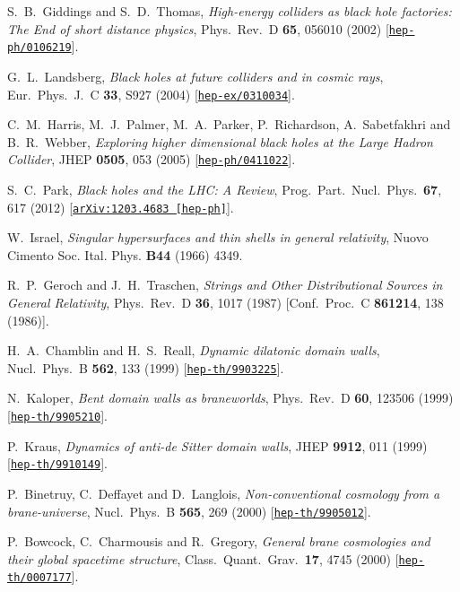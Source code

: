 \documentclass[aps,12pt,prd,superscriptaddress,preprintnumbers, 
	amssymb,
	amsmath,
	notitlepage,
	longbibliography,
	nofootinbib]{revtex4-1}
\begin{document}
\begin{thebibliography}{10}
S.~B.~Giddings and S.~D.~Thomas,
{\it High-energy colliders as black hole factories: The End of short distance physics},
Phys.\ Rev.\ D {\bf 65}, 056010 (2002)
[\href{http://xxx.lanl.gov/abs/hep-ph/0106219}{{\tt hep-ph/0106219}}].

G.~L.~Landsberg,
{\it Black holes at future colliders and in cosmic rays},
Eur.\ Phys.\ J.\ C {\bf 33}, S927 (2004)
[\href{http://xxx.lanl.gov/abs/hep-ex/0310034}{{\tt hep-ex/0310034}}].

C.~M.~Harris, M.~J.~Palmer, M.~A.~Parker, P.~Richardson, 
A.~Sabetfakhri and B.~R.~Webber,
{\it Exploring higher dimensional black holes at the Large Hadron Collider},
JHEP {\bf 0505}, 053 (2005)
[\href{http://xxx.lanl.gov/abs/hep-ph/0411022}{{\tt hep-ph/0411022}}].

S.~C.~Park,
{\it Black holes and the LHC: A Review},
Prog.\ Part.\ Nucl.\ Phys.\  {\bf 67}, 617 (2012)
[\href{http://xxx.lanl.gov/abs/1203.4683}{{\tt arXiv:1203.4683 [hep-ph]}}].

W.~Israel,
{\it {Singular hypersurfaces and thin shells in general relativity}},  
Nuovo Cimento Soc. Ital. Phys. {\bf B44} (1966) 4349.

R.~P.~Geroch and J.~H.~Traschen,
{\it Strings and Other Distributional Sources in General Relativity},
Phys.\ Rev.\ D {\bf 36}, 1017 (1987)
[Conf.\ Proc.\ C {\bf 861214}, 138 (1986)].

H.~A.~Chamblin and H.~S.~Reall,
{\it Dynamic dilatonic domain walls},
Nucl.\ Phys.\ B {\bf 562}, 133 (1999)
[\href{http://xxx.lanl.gov/abs/hep-th/9903225}{{\tt hep-th/9903225}}].

N.~Kaloper,
{\it Bent domain walls as braneworlds},
Phys.\ Rev.\ D {\bf 60}, 123506 (1999)
[\href{http://xxx.lanl.gov/abs/hep-th/9905210}{{\tt hep-th/9905210}}].

P.~Kraus,
{\it Dynamics of anti-de Sitter domain walls},
JHEP {\bf 9912}, 011 (1999)
[\href{http://xxx.lanl.gov/abs/hep-th/9910149}{{\tt hep-th/9910149}}].

P.~Binetruy, C.~Deffayet and D.~Langlois,
{\it Non-conventional cosmology from a brane-universe},
Nucl.\ Phys.\ B {\bf 565}, 269 (2000)
[\href{http://xxx.lanl.gov/abs/hep-th/9905012}{{\tt hep-th/9905012}}].

P.~Bowcock, C.~Charmousis and R.~Gregory,
{\it General brane cosmologies and their global spacetime structure},
Class.\ Quant.\ Grav.\  {\bf 17}, 4745 (2000)
[\href{http://xxx.lanl.gov/abs/hep-th/0007177}{{\tt hep-th/0007177}}].


\end{thebibliography}
\end{document}
